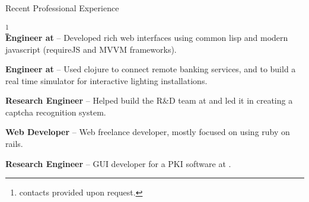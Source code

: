 \begin{rubric}{Recent Professional Experience}{ \footnote{contacts
provided upon request.}  \\

    \entry*[2013-06 - 2015-02] \textbf{Engineer at
} --
Developed rich web interfaces using common lisp and modern javascript
(requireJS and MVVM frameworks).

    \entry*[2012 - 2013-06] \textbf{Engineer at
} --
Used clojure to connect remote banking services, and to build a real
time simulator for interactive lighting installations.

    \entry*[2010 - 2012] \textbf{Research Engineer} -- Helped build
the R\&D team at 
and led it in creating a captcha recognition system.

    \entry*[2007-2009] \textbf{Web Developer} -- Web freelance
developer, mostly focused on using ruby on rails.

    \entry*[2005 - 2007] \textbf{Research Engineer} -- GUI developer
for a PKI software at .

}
\end{rubric}
